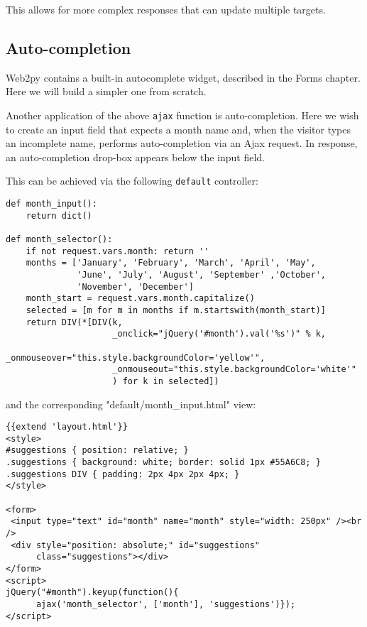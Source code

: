 \documentclass[justified,sixbynine,notoc]{tufte-book}
\def\ft{\small\tt}
\begin{document}
\begin{fullwidth}
This allows for more complex responses that can update multiple targets.

\goodbreak\subsection{Auto-completion}

Web2py contains a built-in autocomplete widget, described in the Forms chapter. Here we will build a simpler one from scratch.

Another application of the above {\ft ajax} function is auto-completion. Here we wish to create an input field that expects a month name and, when the visitor types an incomplete name, performs auto-completion via an Ajax request. In response, an auto-completion drop-box appears below the input field.

This can be achieved via the following {\ft default} controller:
\begin{lstlisting}
def month_input():
    return dict()

def month_selector():
    if not request.vars.month: return ''
    months = ['January', 'February', 'March', 'April', 'May',
              'June', 'July', 'August', 'September' ,'October',
              'November', 'December']
    month_start = request.vars.month.capitalize()
    selected = [m for m in months if m.startswith(month_start)]
    return DIV(*[DIV(k,
                     _onclick="jQuery('#month').val('%s')" % k,
                     _onmouseover="this.style.backgroundColor='yellow'",
                     _onmouseout="this.style.backgroundColor='white'"
                     ) for k in selected])
\end{lstlisting}
\noindent and the corresponding "default/month\_input.html" view:
\begin{lstlisting}[keywords={}]
{{extend 'layout.html'}}
<style>
#suggestions { position: relative; }
.suggestions { background: white; border: solid 1px #55A6C8; }
.suggestions DIV { padding: 2px 4px 2px 4px; }
</style>

<form>
 <input type="text" id="month" name="month" style="width: 250px" /><br />
 <div style="position: absolute;" id="suggestions"
      class="suggestions"></div>
</form>
<script>
jQuery("#month").keyup(function(){
      ajax('month_selector', ['month'], 'suggestions')});
</script>
\end{lstlisting}


\end{fullwidth}
\end{document}
